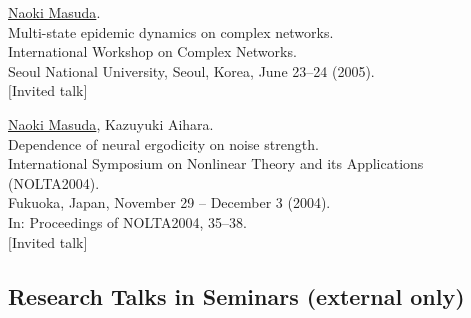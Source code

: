 \documentclass[11pt,letter]{article}
\begin{document}
\begin{etaremune}
\item \underline{Naoki Masuda}.\\
Multi-state epidemic dynamics on complex networks.\\
International Workshop on Complex Networks.\\
Seoul National University, Seoul, Korea, June 23--24 (2005).\\
$[$Invited talk$]$

\item \underline{Naoki Masuda}, Kazuyuki Aihara.\\
Dependence of neural ergodicity on noise strength.\\
International Symposium on Nonlinear Theory and its Applications (NOLTA2004).\\
Fukuoka, Japan, November 29 -- December 3 (2004).\\
In: Proceedings of NOLTA2004, 35--38.\\
$[$Invited talk$]$

\end{etaremune}

\subsection*{\bf Research Talks in Seminars (external only)
}
\end{document}
